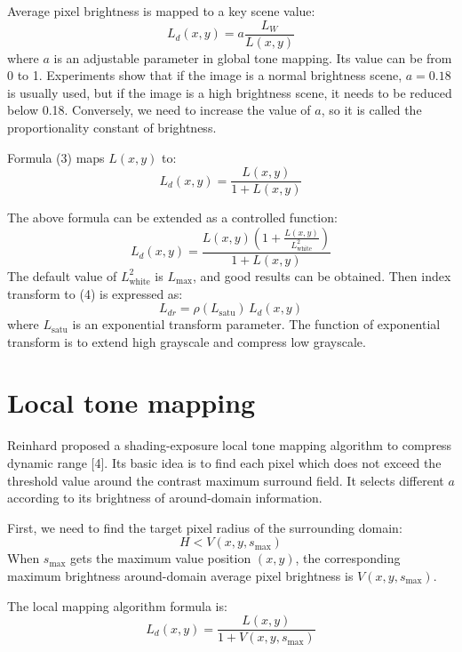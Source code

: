 \documentclass[11pt]{article}
\begin{document}
Average pixel brightness is mapped to a key scene value:
\begin{equation}
L_d(x,y)=a\frac{L_W}{L(x,y)}
\end{equation}
where $a$ is an adjustable parameter in global tone mapping. Its value can be from 0 to 1. Experiments show that if the image is a normal brightness scene, $a=0.18$ is usually used, but if the image is a high brightness scene, it needs to be reduced below 0.18. Conversely, we need to increase the value of $a$, so it is called the proportionality constant of brightness.

Formula (3) maps $L(x,y)$ to:
\begin{equation}
L_d(x,y)=\frac{L(x,y)}{1+L(x,y)}
\end{equation}

The above formula can be extended as a controlled function:
\begin{equation}
L_d(x,y)=\frac{L(x,y)\left(1+\frac{L(x,y)}{L_{\text{white}}^2}\right)}{1+L(x,y)}
\end{equation}
The default value of $L_{\text{white}}^2$ is $L_{\max}$, and good results can be obtained. Then index transform to (4) is expressed as:
\begin{equation}
L_{dr} = \rho(L_{\text{satu}})\,L_d(x,y)
\end{equation}
where $L_{\text{satu}}$ is an exponential transform parameter. The function of exponential transform is to extend high grayscale and compress low grayscale.

\section{Local tone mapping}

Reinhard proposed a shading-exposure local tone mapping algorithm to compress dynamic range [4]. Its basic idea is to find each pixel which does not exceed the threshold value around the contrast maximum surround field. It selects different $a$ according to its brightness of around-domain information.

First, we need to find the target pixel radius of the surrounding domain:
\begin{equation}
H < V(x,y,s_{\max})
\end{equation}
When $s_{\max}$ gets the maximum value position $(x,y)$, the corresponding maximum brightness around-domain average pixel brightness is $V(x,y,s_{\max})$.

The local mapping algorithm formula is:
\begin{equation}
L_d(x,y)=\frac{L(x,y)}{1+V(x,y,s_{\max})}
\end{equation}
\end{document}
